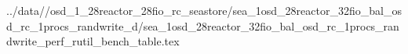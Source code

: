 ../data//osd_1_28reactor_28fio_rc_seastore/sea_1osd_28reactor_32fio_bal_osd_rc_1procs_randwrite_d/sea_1osd_28reactor_32fio_bal_osd_rc_1procs_randwrite_perf_rutil_bench_table.tex